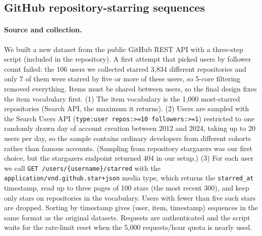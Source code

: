 \documentclass[11pt]{article}
\begin{document}
\begin{table}[t]
\centering
\small
{}
\caption{Datasets outside the paper, after 5-core filtering (statistics computed from the files used in our runs).}
\label{tab:newdata}
\end{table}

\subsection{GitHub repository-starring sequences}

\paragraph{Source and collection.}
We built a new dataset from the public GitHub REST API with a three-step script
(included in the repository). A first attempt that picked users by follower count
failed: the 106 users we collected starred 3{,}834 different repositories and only 7
of them were starred by five or more of these users, so 5-core filtering removed
everything. Items must be shared between users, so the final design fixes the item
vocabulary first. (1) The item vocabulary is the 1{,}000 most-starred repositories
(Search API, the maximum it returns). (2) Users are sampled with the Search Users API
(\texttt{type:user repos:>=10 followers:>=1}) restricted to one randomly drawn day of
account creation between 2012 and 2024, taking up to 20 users per day, so the sample
contains ordinary developers from different cohorts rather than famous accounts.
(Sampling from repository stargazers was our first choice, but the stargazers
endpoint returned 404 in our setup.) (3) For each user we call
\texttt{GET /users/\{username\}/starred} with the \texttt{application/vnd.github.star+json}
media type, which returns the \texttt{starred\_at} timestamp, read up to three pages
of 100 stars (the most recent 300), and keep only stars on repositories in the
vocabulary. Users with fewer than five such stars are dropped. Sorting by timestamp
gives (user, item, timestamp) sequences in the same format as the original datasets.
Requests are authenticated and the script waits for the rate-limit reset when the
5{,}000 requests/hour quota is nearly used.
\end{document}
